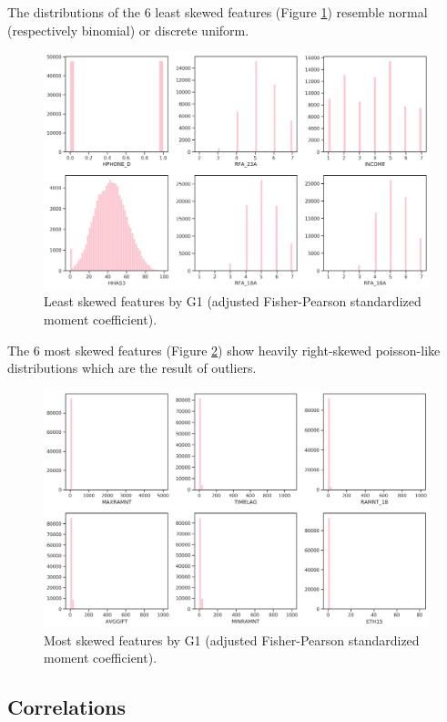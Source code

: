 \documentclass[
  11pt,
  a4paper,
  DIV=12,captions=tableheading,oneside,titlepage]{scrbook}
\begin{document}
The distributions of the 6 least skewed features (Figure \ref{fig:least-skewed}) resemble normal (respectively binomial) or discrete uniform.

\begin{figure}

{\centering \includegraphics[width=0.7\linewidth]{figures/eda/least-skewed} 

}

\caption{Least skewed features by G1 (adjusted Fisher-Pearson standardized moment coefficient).}\label{fig:least-skewed}
\end{figure}

The 6 most skewed features (Figure \ref{fig:most-skewed}) show heavily right-skewed poisson-like distributions which are the result of outliers.

\begin{figure}

{\centering \includegraphics[width=0.7\linewidth]{figures/eda/most-skewed} 

}

\caption{Most skewed features by G1 (adjusted Fisher-Pearson standardized moment coefficient).}\label{fig:most-skewed}
\end{figure}

\hypertarget{correlations}{%
\subsection{Correlations}\label{correlations}}
\end{document}
